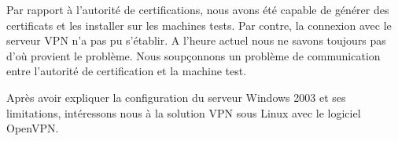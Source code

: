 Par rapport à l'autorité de certifications, nous avons été capable de générer des certificats et les installer sur les machines tests. Par contre, la connexion avec le serveur VPN n'a pas pu s'établir. A l'heure actuel nous ne savons toujours pas d'où provient le problème. Nous soupçonnons un problème de communication entre l'autorité de certification et la machine test.

Après avoir expliquer la configuration du serveur Windows 2003 et ses limitations, intéressons nous à la solution VPN sous Linux avec le logiciel OpenVPN.
 


